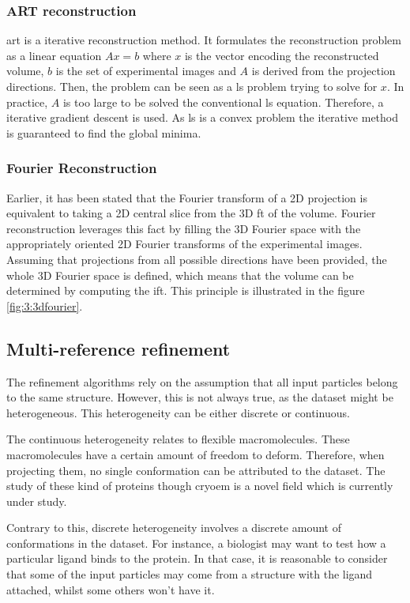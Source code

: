 \documentclass[../main.tex]{subfiles}
\begin{document}
\subsubsection{ART reconstruction}
\Gls{art} is a iterative reconstruction method. It formulates the reconstruction problem as a linear equation $Ax = b$ where $x$ is the vector encoding the reconstructed volume, $b$ is the set of experimental images and $A$ is derived from the projection directions. Then, the problem can be seen as a \gls{ls} problem trying to solve for $x$. In practice, $A$ is too large to be solved the conventional \gls{ls} equation. Therefore, a iterative gradient descent is used. As \gls{ls} is a convex problem the iterative method is guaranteed to find the global minima.

\subsubsection{Fourier Reconstruction}
Earlier, it has been stated that the Fourier transform of a 2D projection is equivalent to taking a 2D central slice from the 3D \gls{ft} of the volume. Fourier reconstruction leverages this fact by filling the 3D Fourier space with the appropriately oriented 2D Fourier transforms of the experimental images. Assuming that projections from all possible directions have been provided, the whole 3D Fourier space is defined, which means that the volume can be determined by computing the \gls{ift}. This principle is illustrated in the figure \ref{fig:3:3dfourier}.

\subsection{Multi-reference refinement}
The refinement algorithms rely on the assumption that all input particles belong to the same structure. However, this is not always true, as the dataset might be heterogeneous. This heterogeneity can be either discrete or continuous. 

The continuous heterogeneity relates to flexible macromolecules. These macromolecules have a certain amount of freedom to deform. Therefore, when projecting them, no single conformation can be attributed to the dataset. The study of these kind of proteins though \gls{cryoem} is a novel field which is currently under study.

Contrary to this, discrete heterogeneity involves a discrete amount of conformations in the dataset. For instance, a biologist may want to test how a particular ligand binds to the protein. In that case, it is reasonable to consider that some of the input particles may come from a structure with the ligand attached, whilst some others won't have it.
\end{document}
